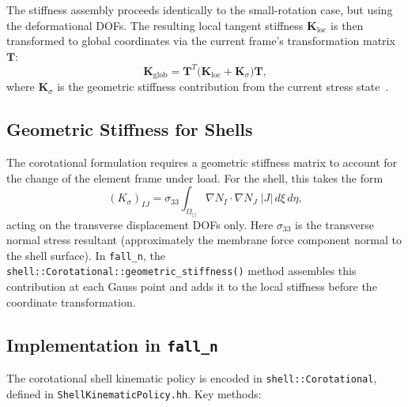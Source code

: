 The stiffness assembly proceeds identically to the small-rotation
case, but using the deformational DOFs.  The resulting local
tangent stiffness $\mathbf{K}_\mathrm{loc}$ is then transformed
to global coordinates via the current frame's transformation
matrix $\mathbf{T}$:
\begin{equation}
  \mathbf{K}_{\mathrm{glob}} =
  \mathbf{T}^T \bigl(\mathbf{K}_\mathrm{loc}
  + \mathbf{K}_\sigma\bigr) \mathbf{T}
  ,
  \label{eq:K-glob}
\end{equation}
where $\mathbf{K}_\sigma$ is the geometric stiffness contribution
from the current stress state~\cite{FelippaHaugen2005}.

\subsection{Geometric Stiffness for Shells}
\label{sec:geom-stiffness}

The corotational formulation requires a geometric stiffness matrix
to account for the change of the element frame under load.  For
the shell, this takes the form
\begin{equation}
  (K_\sigma)_{IJ} = \sigma_{33}
  \int_{\Omega_{\Box}}
    \nabla N_I \cdot \nabla N_J
    \; \lvert J \rvert \, d\xi\, d\eta
  ,
  \label{eq:K-sigma}
\end{equation}
acting on the transverse displacement DOFs only.  Here $\sigma_{33}$
is the transverse normal stress resultant (approximately the
membrane force component normal to the shell surface).  In
\texttt{fall\_n}, the \texttt{shell::Corotational::geometric\_stiffness()}
method assembles this contribution at each Gauss point and adds it
to the local stiffness before the coordinate transformation.

\subsection{Implementation in \texttt{fall\_n}}
\label{sec:cr-implementation}

The corotational shell kinematic policy is encoded in
\texttt{shell::Corotational}, defined in
\texttt{ShellKinematicPolicy.hh}.  Key methods:


